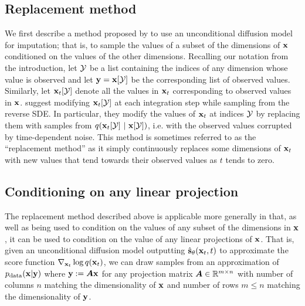 \subsection{Replacement method}
We first describe a method proposed by \citet{song2020score} to use an unconditional diffusion model for imputation; that is, to sample the values of a subset of the dimensions of ${\mathbf{x}}$ conditioned on the values of the other dimensions. Recalling our notation from the introduction, let ${\mathcal{Y}}$ be a list containing the indices of any dimension whose value is observed and let ${\mathbf{y}} = {\mathbf{x}}[{\mathcal{Y}}]$ be the corresponding list of observed values.
Similarly, let ${\mathbf{x}}_t[{\mathcal{Y}}]$ denote all the values in ${\mathbf{x}}_t$ corresponding to observed values in ${\mathbf{x}}$.
\citet{song2020score} suggest modifying ${\mathbf{x}}_t[{\mathcal{Y}}]$ at each integration step while sampling from the reverse SDE. In particular, they modify the values of ${\mathbf{x}}_t$ at indices ${\mathcal{Y}}$ by replacing them with samples from $q({\mathbf{x}}_t[{\mathcal{Y}}] ~|~ {\mathbf{x}}[{\mathcal{Y}}] )$, i.e. with the observed values corrupted by time-dependent noise. This method is sometimes referred to as the ``replacement method'' as it simply continuously replaces some dimensions of ${\mathbf{x}}_t$ with new values that tend towards their observed values as $t$ tends to zero.

\subsection{Conditioning on any linear projection}
The replacement method described above is applicable more generally in that, as well as being used to condition on the values of any subset of the dimensions in ${\mathbf{x}}$, it can be used to condition on the value of any linear projections of ${\mathbf{x}}$. That is, given an unconditional diffusion model outputting $\hat{{\mathbf{s}}}_\theta({\mathbf{x}}_t, t)$ to approximate the score function $\nabla_{{\mathbf{x}}_t} \log q({\mathbf{x}}_t)$, we can draw samples from an approximation of $p_{\rm{data}}({\mathbf{x}}|{\mathbf{y}})$ where ${\mathbf{y}}:={\bm{A}}{\mathbf{x}}$ for any projection matrix ${\bm{A}} \in \mathbb{R}^{m \times n}$ with number of columns $n$ matching the dimensionality of ${\mathbf{x}}$ and number of rows $m \leq n$ matching the dimensionality of ${\mathbf{y}}$.

